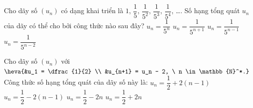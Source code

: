 \begin{ex}%
	Cho dãy số $(u_n)$ có dạng khai triển là $1$, $\dfrac{1}{5}$, $\dfrac{1}{5^2}$, $\dfrac{1}{5^3}$,  $\dfrac{1}{5^4}$, \ldots. Số hạng tổng quát $u_n$ của dãy có thể cho bởi công thức nào sau đây?
	\choice 
		 {$u_n=\dfrac{1}{5^n}$}
		{$u_n=\dfrac{1}{5^{n+1}}$} 
		 {\True $u_n=\dfrac{1}{5^{n-1}}$}
		 {$u_n=\dfrac{1}{5^{n-2}}$}
\end{ex}

\begin{ex}%
	Cho dãy số  $(u_n)$ với $\heva{&u_1 = \dfrac{1}{2} \\
	&u_{n+1} = u_n - 2, \ n \in \mathbb{N}^*.}$ Công thức số hạng tổng quát của  dãy số này là:
	 \choice
		{$u_n  = \dfrac{1}{2} + 2(n-1)$}
		 {\True $u_n = \dfrac{1}{2} - 2(n-1)$}
		{$u_n =  \dfrac{1}{2} - 2n$}
		{$u_n = \dfrac{1}{2} +  2n$}
\end{ex}

